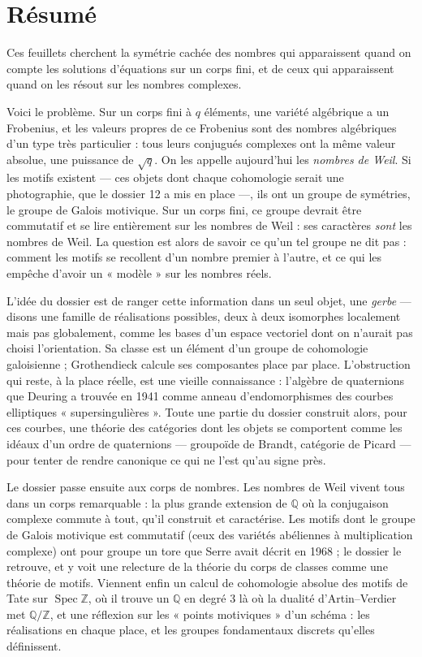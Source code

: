 \documentclass[11pt,a4paper]{article}
\begin{document}
\section*{Résumé}

\begin{resume}
Ces feuillets cherchent la symétrie cachée des nombres qui apparaissent
quand on compte les solutions d'équations sur un corps fini, et de ceux qui
apparaissent quand on les résout sur les nombres complexes.

Voici le problème. Sur un corps fini à $q$ éléments, une variété algébrique
a un Frobenius, et les valeurs propres de ce Frobenius sont des nombres
algébriques d'un type très particulier : tous leurs conjugués complexes ont
la même valeur absolue, une puissance de $\sqrt{q}$. On les appelle
aujourd'hui les \emph{nombres de Weil}. Si les motifs existent --- ces
objets dont chaque cohomologie serait une photographie, que le dossier 12 a
mis en place ---, ils ont un groupe de symétries, le groupe de Galois
motivique. Sur un corps fini, ce groupe devrait être commutatif et se lire
entièrement sur les nombres de Weil : ses caractères \emph{sont} les nombres
de Weil. La question est alors de savoir ce qu'un tel groupe ne dit pas :
comment les motifs se recollent d'un nombre premier à l'autre, et ce qui les
empêche d'avoir un « modèle » sur les nombres réels.

L'idée du dossier est de ranger cette information dans un seul objet, une
\emph{gerbe} --- disons une famille de réalisations possibles, deux à deux
isomorphes localement mais pas globalement, comme les bases d'un espace
vectoriel dont on n'aurait pas choisi l'orientation. Sa classe est un
élément d'un groupe de cohomologie galoisienne ; Grothendieck calcule ses
composantes place par place. L'obstruction qui reste, à la place réelle, est
une vieille connaissance : l'algèbre de quaternions que Deuring a trouvée en
1941 comme anneau d'endomorphismes des courbes elliptiques « supersingulières ».
Toute une partie du dossier construit alors, pour ces courbes, une théorie
des catégories dont les objets se comportent comme les idéaux d'un ordre
de quaternions --- groupoïde de Brandt, catégorie de Picard --- pour tenter
de rendre canonique ce qui ne l'est qu'au signe près.

Le dossier passe ensuite aux corps de nombres. Les nombres de Weil vivent
tous dans un corps remarquable : la plus grande extension de $\mathbb{Q}$ où
la conjugaison complexe commute à tout, qu'il construit et caractérise. Les
motifs dont le groupe de Galois motivique est commutatif (ceux des variétés
abéliennes à multiplication complexe) ont pour groupe un tore que Serre
avait décrit en 1968 ; le dossier le retrouve, et y voit une relecture de la
théorie du corps de classes comme une théorie de motifs. Viennent enfin un
calcul de cohomologie absolue des motifs de Tate sur $\operatorname{Spec}
\mathbb{Z}$, où il trouve un $\mathbb{Q}$ en degré $3$ là où la dualité
d'Artin--Verdier met $\mathbb{Q}/\mathbb{Z}$, et une réflexion sur les
« points motiviques » d'un schéma : les réalisations en chaque place, et
les groupes fondamentaux discrets qu'elles définissent.


\end{resume}
\end{document}
